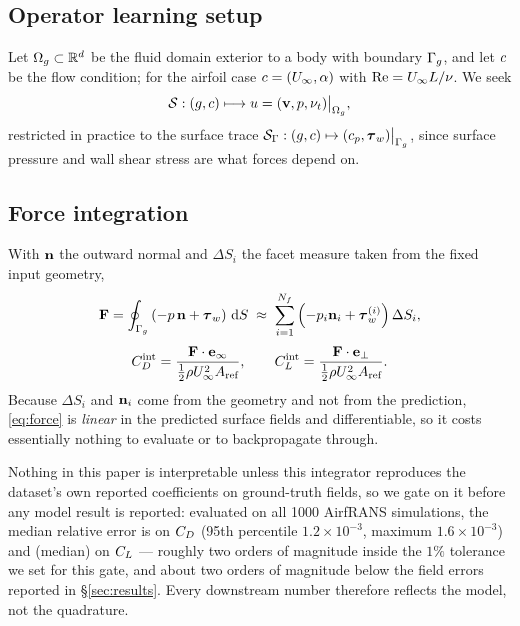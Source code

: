 \documentclass[11pt,a4paper]{article}
\begin{document}
\subsection{Operator learning setup}
Let $\Omega_{g} \subset \mathbb{R}^d$ be the fluid domain exterior to a body with boundary
$\Gamma_{g}$, and let $c$ be the flow condition; for the airfoil case
$c = (U_{\infty}, \alpha)$ with $\mathrm{Re} = U_{\infty} L / \nu$. We seek
\begin{equation}
  \mathcal{S} : (g, c) \longmapsto u = (\mathbf{v}, p, \nu_t)\big|_{\Omega_{g}},
\end{equation}
restricted in practice to the surface trace
$\mathcal{S}_{\Gamma} : (g,c) \mapsto (c_p, \boldsymbol{\tau}_{w})\big|_{\Gamma_{g}}$, since surface pressure
and wall shear stress are what forces depend on.

\subsection{Force integration}
With $\mathbf{n}$ the outward normal and $\Delta S_i$ the facet measure taken from the
fixed input geometry,
\begin{equation}
  \mathbf{F} = \oint_{\Gamma_{g}} \left( -p\,\mathbf{n} + \boldsymbol{\tau}_{w} \right) \,\mathrm{d}S
      \;\approx\; \sum_{i=1}^{N_f} \left( -p_i \mathbf{n}_i + \boldsymbol{\tau}_{w}^{(i)} \right) \Delta S_i,
  \label{eq:force}
\end{equation}
\begin{equation}
  C_D^{\text{int}} = \frac{\mathbf{F} \cdot \mathbf{e}_{\infty}}{\tfrac12 \rho U_{\infty}^2 A_{\text{ref}}}, \qquad
  C_L^{\text{int}} = \frac{\mathbf{F} \cdot \mathbf{e}_{\perp}}{\tfrac12 \rho U_{\infty}^2 A_{\text{ref}}}.
\end{equation}
Because $\Delta S_i$ and $\mathbf{n}_i$ come from the geometry and not from the
prediction, \eqref{eq:force} is \emph{linear} in the predicted surface fields and
differentiable, so it costs essentially nothing to evaluate or to backpropagate
through.

Nothing in this paper is interpretable unless this integrator reproduces the
dataset's own reported coefficients on ground-truth fields, so we gate on it
before any model result is reported: evaluated on all 1000 AirfRANS simulations,
the median relative error is  on $C_D$
(95th percentile $1.2\times10^{-3}$, maximum $1.6\times10^{-3}$) and
 (median) on $C_L$ --- roughly two orders of
magnitude inside the $1\%$ tolerance we set for this gate, and about two orders
of magnitude below the field errors reported in \S\ref{sec:results}. Every
downstream \FSC{} number therefore reflects the model, not the quadrature.
\end{document}
